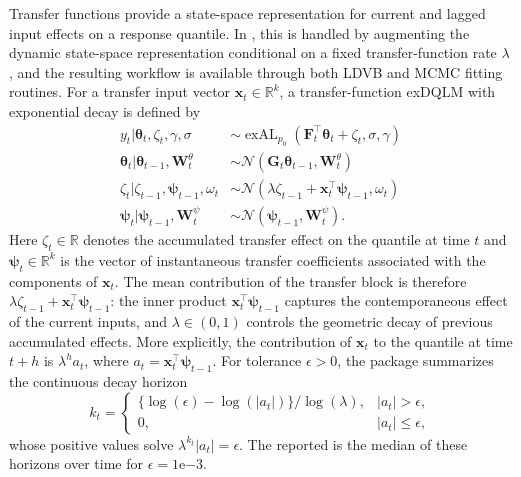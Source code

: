 \documentclass{jss}
\newcommand{\vect}[1]{\boldsymbol{#1}}
\newcommand{\mat}[1]{\mathbf{#1}}
\newcommand{\N}{\mathcal{N}}
\newcommand{\exAL}{\operatorname{exAL}}
\begin{document}
Transfer functions provide a state-space representation for current and lagged input effects on a response quantile.
In , this is handled by augmenting the dynamic state-space representation conditional on a fixed transfer-function rate \(\lambda\), and the resulting workflow is available through both LDVB and MCMC fitting routines.
For a transfer input vector $\mat{x}_t \in \mathbb{R}^k$, a transfer-function exDQLM with exponential decay is defined by
\begin{align}
\label{EQ:begin_transfer}
y_t | \vect{\theta}_t,\zeta_t,\gamma,\sigma  & \sim \exAL_{p_0}(\mat{F}_t^\top \vect{\theta}_t +  \zeta_{t},\sigma,\gamma) \\
\vect{\theta}_t | \vect{\theta}_{t-1},\mat{W}_t^\theta  & \sim  \N(\mat{G}_t \vect{\theta}_{t-1},\mat{W}_t^\theta) \\
\label{EQ:transfer_effect}
\zeta_{t}|\zeta_{t-1},\vect{\psi}_{t-1},\omega_{t} & \sim \N(\lambda \zeta_{t-1} + \mat{x}_{t}^\top \vect{\psi}_{t-1},\omega_{t}) \\
\label{EQ:end_transfer}
\vect{\psi}_{t}|\vect{\psi}_{t-1},\mat{W}_{t}^{\psi} & \sim \N(\vect{\psi}_{t-1},\mat{W}_{t}^{\psi}).
\end{align}
Here $\zeta_t \in \mathbb{R}$ denotes the accumulated transfer effect on the quantile at time $t$ and $\vect{\psi}_t \in \mathbb{R}^k$ is the vector of instantaneous transfer coefficients associated with the components of $\mat{x}_t$. The mean contribution of the transfer block is therefore $\lambda \zeta_{t-1} + \mat{x}_t^\top \vect{\psi}_{t-1}$: the inner product $\mat{x}_t^\top \vect{\psi}_{t-1}$ captures the contemporaneous effect of the current inputs, and $\lambda\in(0,1)$ controls the geometric decay of previous accumulated effects. More explicitly, the contribution of $\mat{x}_t$ to the quantile at time $t+h$ is $\lambda^h a_t$, where \(a_t=\mat{x}_t^\top \vect{\psi}_{t-1}\). For tolerance $\epsilon>0$, the package summarizes the continuous decay horizon
\[
k_t =
\begin{cases}
\{\log(\epsilon)-\log(|a_t|)\}/\log(\lambda), & |a_t|>\epsilon,\\
0, & |a_t|\leq \epsilon,
\end{cases}
\]
whose positive values solve \(\lambda^{k_t}|a_t|=\epsilon\). The reported  is the median of these horizons over time for $\epsilon = 1\mathrm{e}{-3}$.
\end{document}
